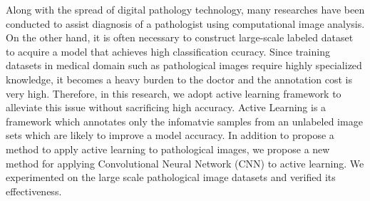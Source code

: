 Along with the spread of digital pathology technology, 
many researches have been conducted to assist diagnosis of a pathologist using computational image analysis.
On the other hand, it is often necessary to construct large-scale labeled dataset to acquire a model that achieves high classification ccuracy.
Since training datasets in medical domain such as pathological images require highly specialized knowledge, 
it becomes a heavy burden to the doctor and the annotation cost is very high.
Therefore, in this research, we adopt active learning framework to alleviate this issue without sacrificing high accuracy.
Active Learning is a framework which annotates only the infomatvie samples from an unlabeled image sets which are likely to improve a model accuracy.
In addition to propose a method to apply active learning to pathological images, 
we propose a new method for applying Convolutional Neural Network (CNN) to active learning.
We experimented on the large scale pathological image datasets and verified its effectiveness.